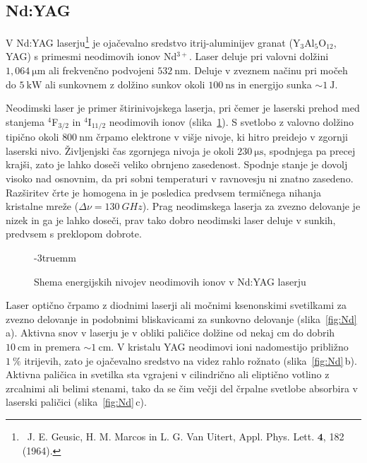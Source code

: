 \subsection{Nd:YAG}
V Nd:YAG laserju\footnote{~J. E. Geusic,
H. M. Marcos in L. G. Van Uitert, Appl. Phys. Lett. $\mathbf{4}$, 182 (1964).} je ojačevalno sredstvo
itrij-aluminijev granat (Y$_3$Al$_5$O$_{12}$, YAG) s primesmi neodimovih ionov Nd$^{3+}$. 
Laser deluje pri valovni dolžini $1,064~\si{\micro\meter}$ ali frekvenčno podvojeni
$532~\si{\nano\metre}$. Deluje v zveznem 
načinu pri močeh do $5~\si{\kilo\watt}$ ali sunkovnem z dolžino sunkov okoli 
$100~\si{\nano\second}$ in energijo sunka $\sim 1~\si{\joule}$.

Neodimski laser je primer štirinivojskega laserja, 
pri čemer je 
laserski prehod med stanjema $^4$F$_{3/2}$ in $^4$I$_{11/2}$ neodimovih ionov 
(slika~\ref{fig:NdE}). S svetlobo z valovno dolžino tipično okoli $800~\si{\nano\metre}$
črpamo elektrone v višje nivoje, ki hitro 
preidejo v zgornji laserski nivo. Življenjski čas zgornjega nivoja je 
okoli $230~\si{\micro\second}$, spodnjega pa precej krajši, zato je 
lahko doseči veliko obrnjeno zasedenost. Spodnje stanje je dovolj visoko nad 
osnovnim, da pri sobni temperaturi v ravnovesju ni znatno zasedeno. 
Razširitev črte je homogena in je posledica predvsem 
termičnega nihanja kristalne mreže ($\Delta \nu = 130~\si{GHz}$). 
Prag neodimskega laserja za zvezno delovanje je nizek in ga je lahko doseči, 
prav tako dobro neodimski laser deluje v sunkih, predvsem s preklopom dobrote.
\begin{figure}[ht]
\centering
\def\svgwidth{85truemm} 

\caption{Shema energijskih nivojev neodimovih ionov v Nd:YAG laserju}
\label{fig:NdE}
\vglue-3truemm
\end{figure}

Laser optično črpamo z diodnimi laserji ali močnimi ksenonskimi svetilkami za zvezno delovanje 
in podobnimi bliskavicami za sunkovno delovanje (slika~\ref{fig:Nd}\,a). 
Aktivna snov v laserju je v obliki paličice dolžine od nekaj cm do dobrih 
$10~\si{\centi\metre}$ in premera $\sim 1~\si{\centi\metre}$. 
V kristalu YAG neodimovi ioni nadomestijo približno $1~\%$ itrijevih, zato je ojačevalno
sredstvo na videz rahlo rožnato (slika~\ref{fig:Nd}\,b). 
Aktivna paličica in svetilka sta vgrajeni v cilindrično ali eliptično votlino z 
zrcalnimi ali belimi stenami, tako da se čim večji del črpalne svetlobe absorbira v 
laserski paličici (slika~\ref{fig:Nd}\,c).

